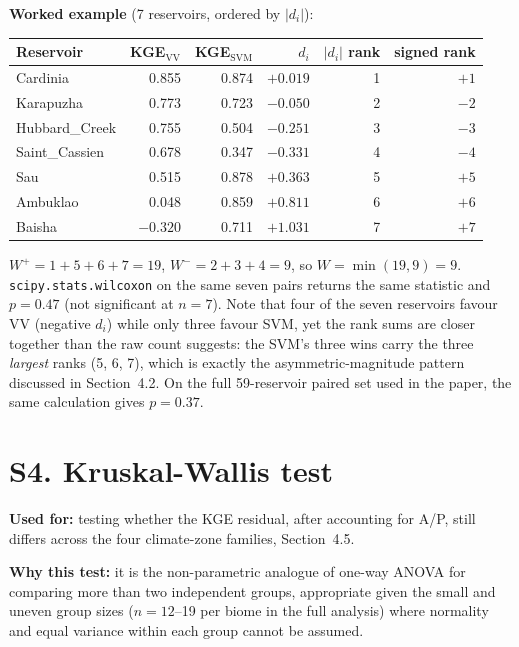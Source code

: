 \documentclass[12pt,authoryear]{elsarticle}
\begin{document}
\textbf{Worked example} (7 reservoirs, ordered by $|d_i|$):

\begin{center}
\begin{tabular}{lrrrrr}
\toprule
Reservoir & KGE$_{\text{VV}}$ & KGE$_{\text{SVM}}$ & $d_i$ & $|d_i|$ rank & signed rank \\
\midrule
Cardinia       & 0.855  & 0.874 & $+0.019$ & 1 & $+1$ \\
Karapuzha      & 0.773  & 0.723 & $-0.050$ & 2 & $-2$ \\
Hubbard\_Creek & 0.755  & 0.504 & $-0.251$ & 3 & $-3$ \\
Saint\_Cassien & 0.678  & 0.347 & $-0.331$ & 4 & $-4$ \\
Sau            & 0.515  & 0.878 & $+0.363$ & 5 & $+5$ \\
Ambuklao       & 0.048  & 0.859 & $+0.811$ & 6 & $+6$ \\
Baisha         & $-0.320$ & 0.711 & $+1.031$ & 7 & $+7$ \\
\bottomrule
\end{tabular}
\end{center}

$W^+ = 1+5+6+7 = 19$, $W^- = 2+3+4 = 9$, so $W = \min(19,9) = 9$.
\texttt{scipy.stats.wilcoxon} on the same seven pairs returns the same
statistic and $p = 0.47$ (not significant at $n=7$). Note that four of the
seven reservoirs favour VV (negative $d_i$) while only three favour SVM, yet
the rank sums are closer together than the raw count suggests: the SVM's
three wins carry the three \emph{largest} ranks (5, 6, 7), which is exactly
the asymmetric-magnitude pattern discussed in Section~4.2. On the full
59-reservoir paired set used in the paper, the same calculation gives
$p = 0.37$.

\section*{S4. Kruskal-Wallis test \citep{KruskalWallis1952}}

\textbf{Used for:} testing whether the KGE residual, after accounting for
A/P, still differs across the four climate-zone families, Section~4.5.

\textbf{Why this test:} it is the non-parametric analogue of one-way ANOVA
for comparing more than two independent groups, appropriate given the small
and uneven group sizes ($n=12$--19 per biome in the full analysis) where
normality and equal variance within each group cannot be assumed.
\end{document}
